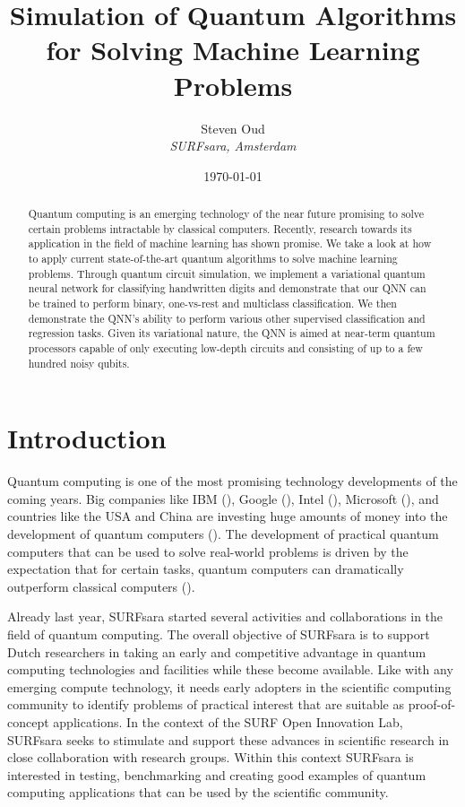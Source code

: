 \documentclass[a4paper,10pt]{article}
\title{Simulation of Quantum Algorithms for Solving Machine Learning Problems}
\author{Steven Oud \\ \emph{SURFsara, Amsterdam}}
\date{\today}
\begin{document}
\maketitle

\begin{abstract}
Quantum computing is an emerging technology of the near future promising to solve certain problems intractable by classical computers.
Recently, research towards its application in the field of machine learning has shown promise.
We take a look at how to apply current state-of-the-art quantum algorithms to solve machine learning problems.
Through quantum circuit simulation, we implement a variational quantum neural network for classifying handwritten digits and demonstrate that our QNN can be trained to perform binary, one-vs-rest and multiclass classification.
We then demonstrate the QNN's ability to perform various other supervised classification and regression tasks.
Given its variational nature, the QNN is aimed at near-term quantum processors capable of only executing low-depth circuits and consisting of up to a few hundred noisy qubits.
\end{abstract}

\clearpage

\tableofcontents

\clearpage

\section{Introduction}
Quantum computing is one of the most promising technology developments of the coming years.
Big companies like IBM (\cite{ibm-quantum}), Google (\cite{google-quantum}), Intel (\cite{intel-quantum}), Microsoft (\cite{microsoft-quantum}), and countries like the USA and China are investing huge amounts of money into the development of quantum computers (\cite{usa-quantum, china-quantum}).
The development of practical quantum computers that can be used to solve real-world problems is driven by the expectation that for certain tasks, quantum computers can dramatically outperform classical computers (\cite{preskill-qc}).

Already last year, SURFsara started several activities and collaborations in the field of quantum computing.
The overall objective of SURFsara is to support Dutch researchers in taking an early and competitive advantage in quantum computing technologies and facilities while these become available.
Like with any emerging compute technology, it needs early adopters in the scientific computing community to identify problems of practical interest that are suitable as proof-of-concept applications.
In the context of the SURF Open Innovation Lab, SURFsara seeks to stimulate and support these advances in scientific research in close collaboration with research groups.
Within this context SURFsara is interested in testing, benchmarking and creating good examples of quantum computing applications that can be used by the scientific community.
\end{document}
